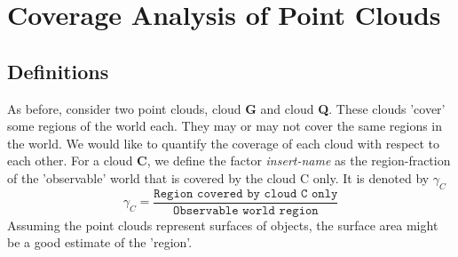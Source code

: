 \documentclass[notitlepage]{article}
\begin{document}
\section{Coverage Analysis of Point Clouds}
    \subsection{Definitions}
    As before, consider two point clouds, cloud \textbf{G} and cloud \textbf{Q}.
    These clouds 'cover' some regions of the world each.
    They may or may not cover the same regions in the world.
    We would like to quantify the coverage of each cloud with respect to each other.
    For a cloud \textbf{C}, we define the factor \emph{insert-name} as the region-fraction of the 'observable' world that is covered by the cloud C only.
    It is denoted by $\gamma_C$
    $$\gamma_C = \frac{\texttt{Region covered by cloud C only}}{\texttt{Observable world region}}$$
    Assuming the point clouds represent surfaces of objects, the surface area might be a good estimate of the 'region'.
\end{document}
